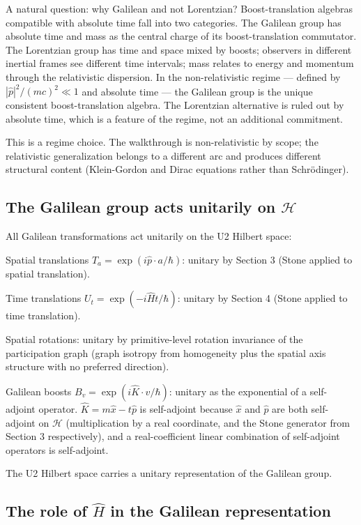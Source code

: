 \documentclass[11pt,a4paper]{article}
\begin{document}
A natural question: why Galilean and not Lorentzian? Boost-translation algebras compatible with absolute time fall into two categories. The Galilean group has absolute time and mass as the central charge of its boost-translation commutator. The Lorentzian group has time and space mixed by boosts; observers in different inertial frames see different time intervals; mass relates to energy and momentum through the relativistic dispersion. In the non-relativistic regime --- defined by $|\hat{p}|^{2}/(mc)^{2} \ll 1$ and absolute time --- the Galilean group is the unique consistent boost-translation algebra. The Lorentzian alternative is ruled out by absolute time, which is a feature of the regime, not an additional commitment.

This is a regime choice. The walkthrough is non-relativistic by scope; the relativistic generalization belongs to a different arc and produces different structural content (Klein-Gordon and Dirac equations rather than Schr\"odinger).

\subsection{The Galilean group acts unitarily on $\mathcal{H}$}

All Galilean transformations act unitarily on the U2 Hilbert space:

Spatial translations $T_a = \exp(i \hat{p} \cdot a / \hbar)$: unitary by Section 3 (Stone applied to spatial translation).

Time translations $U_t = \exp(-i \hat{H} t / \hbar)$: unitary by Section 4 (Stone applied to time translation).

Spatial rotations: unitary by primitive-level rotation invariance of the participation graph (graph isotropy from homogeneity plus the spatial axis structure with no preferred direction).

Galilean boosts $B_v = \exp(i \hat{K} \cdot v / \hbar)$: unitary as the exponential of a self-adjoint operator. $\hat{K} = m\hat{x} - t\hat{p}$ is self-adjoint because $\hat{x}$ and $\hat{p}$ are both self-adjoint on $\mathcal{H}$ (multiplication by a real coordinate, and the Stone generator from Section 3 respectively), and a real-coefficient linear combination of self-adjoint operators is self-adjoint.

The U2 Hilbert space carries a unitary representation of the Galilean group.

\subsection{The role of $\hat{H}$ in the Galilean representation}
\end{document}
